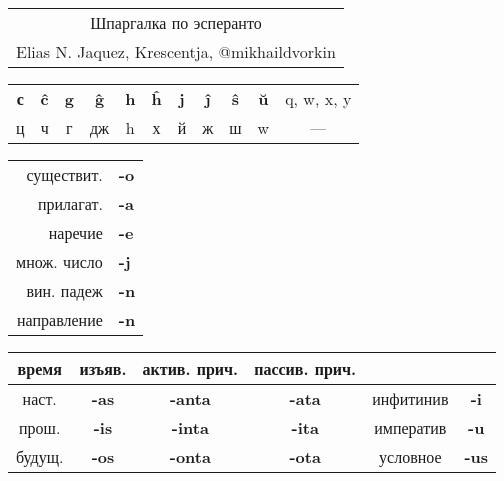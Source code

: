 \documentclass{article}
\def\b#1{\textbf{#1}}
\begin{document}
\begin{tabular}{c}
{\Huge Шпаргалка по эсперанто} \\
{\small Elias N. Jaquez, Krescentja, @mikhail\textunderscore{}dvorkin} \\
\end{tabular}
\hspace{3em}
\begin{tabular}{|c|c|c|c|c|c|c|c|c|c|c|}
\hline
\b{с} & \b{ĉ} & \b{g} & \b{ĝ} & \b{h} & \b{ĥ} & \b{j} & \b{ĵ} & \b{ŝ} & \b{ŭ} & q, w, x, y \\
ц & ч & г & дж & h & х & й & ж & ш & w & --- \\
\hline
\end{tabular}

\begin{tabular}{|r>{\bfseries}l|}
\hline
существит. & -o \\
прилагат. & -a \\
наречие & -e \\
множ. число & -j \\
вин. падеж & -n \\
направление & -n \\
\hline
\end{tabular}
\quad
\begin{tabular}{|c|c|c|c|c|c|}
\hline
время & изъяв. & актив. прич. & пассив. прич. & ~ & ~ \\
\hline
наст. & \b{-as} & \b{-anta} & \b{-ata} & инфитинив & \b{-i} \\
\hline
прош. & \b{-is} & \b{-inta} & \b{-ita} & императив & \b{-u} \\
\hline
будущ. & \b{-os} & \b{-onta} & \b{-ota} & условное & \b{-us} \\
\hline
\end{tabular}
\end{document}
